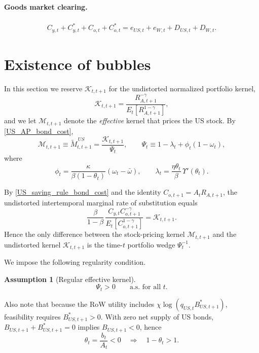 \documentclass[12pt]{article}
\theoremstyle{plain}
\newtheorem{ass}{Assumption}
\begin{document}
\paragraph{Goods market clearing.}
\begin{align}\label{goods_clear_mod}
C_{y,t}+C^*_{y,t}+C_{o,t}+C^*_{o,t}
=
e_{US,t}+e_{W,t}+D_{US,t}+D_{W,t}.
\end{align}

\section{Existence of bubbles}\label{sec:existence_of_bubbles}

In this section we reserve $\mathcal K_{t,t+1}$ for the undistorted normalized portfolio kernel,
\[
\mathcal K_{t,t+1}
=
\frac{R_{A,t+1}^{-\gamma}}{E_t\!\left[R_{A,t+1}^{1-\gamma}\right]},
\]
and we let $\mathcal M_{t,t+1}$ denote the \emph{effective} kernel that prices the US stock. By
\eqref{US_AP_bond_cost},
\begin{equation}\label{effective_US_kernel}
\mathcal M_{t,t+1}
\equiv
\widetilde M^{\,US}_{t,t+1}
=
\frac{\mathcal K_{t,t+1}}{\Psi_t},
\qquad
\Psi_t
\equiv
1-\lambda_t+\phi_t(1-\omega_t),
\end{equation}
where
\[
\phi_t=\frac{\kappa}{\beta(1-\theta_t)}(\omega_t-\bar\omega),
\qquad
\lambda_t=\frac{\eta\theta_t}{\beta}\,\Upsilon'(\theta_t).
\]

By \eqref{US_saving_rule_bond_cost} and the identity $C_{o,t+1}=A_tR_{A,t+1}$, the undistorted
intertemporal marginal rate of substitution equals
\[
\frac{\beta}{1-\beta}\,
\frac{C_{y,t}C_{o,t+1}^{-\gamma}}{E_t\!\left[C_{o,t+1}^{1-\gamma}\right]}
=
\mathcal K_{t,t+1}.
\]
Hence the only difference between the stock-pricing kernel $\mathcal M_{t,t+1}$ and the
undistorted kernel $\mathcal K_{t,t+1}$ is the time-$t$ portfolio wedge $\Psi_t^{-1}$.

We impose the following regularity condition.

\begin{ass}[Regular effective kernel]\label{ass_regular_kernel}
\[
\Psi_t>0
\qquad\text{a.s. for all }t.
\]
\end{ass}

Also note that because the RoW utility includes $\chi\log(q_{US,t}B^*_{US,t+1})$, feasibility requires
$B^*_{US,t+1}>0$. With zero net supply of US bonds,
$B_{US,t+1}+B^*_{US,t+1}=0$ implies $B_{US,t+1}<0$, hence
\begin{equation}\label{theta_nonpos}
\theta_t=\frac{b_t}{A_t}<0
\quad\Rightarrow\quad
1-\theta_t>1.
\end{equation}
\end{document}
